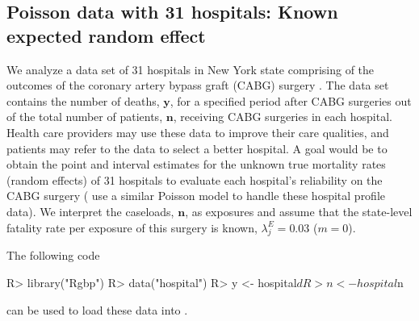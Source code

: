 \documentclass[article]{jss}
\begin{document}
\subsection[Known Second-level Mean]{Poisson data with 31 hospitals: Known expected random effect}
\label{sec:ex:hosp}



We analyze a data set of 31 hospitals in New York state comprising of the outcomes of the coronary artery bypass graft (CABG) surgery \citep{morris2012}. The data set contains the number of deaths, $\boldsymbol{y}$, for a specified period after CABG surgeries out of the total number of patients, $\boldsymbol{n}$, receiving CABG surgeries in each hospital. Health care providers may use these data to improve their care qualities, and patients may refer to the data to select a better hospital. A goal would be to obtain the point and interval estimates for the unknown true mortality rates (random effects) of 31 hospitals to evaluate  each hospital's reliability on the CABG surgery (\cite{morris1995} use a similar Poisson model to handle these hospital profile data). We interpret the caseloads, $\boldsymbol{n}$,  as exposures and assume that the state-level fatality rate per exposure of this surgery  is known, $\lambda^E_j= 0.03$ ($m=0$). 


The following code
\begin{CodeChunk}
\begin{CodeInput}
R> library("Rgbp")
R> data("hospital")
R> y <- hospital$d
R> n <- hospital$n
\end{CodeInput}
\end{CodeChunk}
can be used to load these data into .



\end{document}
